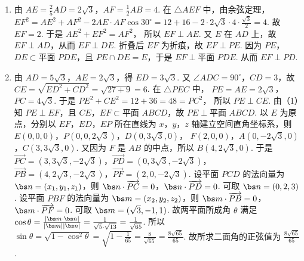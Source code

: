 \begin{solution}
\begin{enumerate}
\item 由
\(AE=\frac25 AD=2\sqrt3\)，\(AF=\frac12 AB=4\).
在 \(\triangle AEF\) 中，由余弦定理，
\(EF^2=AE^2+AF^2-2AE\cdot AF\cos 30^\circ =12+16-2\cdot 2\sqrt3\cdot 4\cdot \frac{\sqrt3}{2}=4\).
故
\(EF=2\).
于是
\(AE^2+EF^2=AF^2\)，
所以
\(EF\perp AE\).
又 \(E\) 在 \(AD\) 上，故 \(EF\perp AD\)，从而 \(EF\perp DE\).
折叠后 \(EF\) 为折痕，故 \(EF\perp PE\). 因为 \(PE\)，\(DE\subset \text{平面 }PDE\)，且 \(PE\cap DE=E\)，于是
\(EF\perp \text{平面 }PDE\).
从而
\(EF\perp PD\).

\item 由 \(AD=5\sqrt3\)，\(AE=2\sqrt3\)，得
\(ED=3\sqrt3\).
又 \(\angle ADC=90^\circ\)，\(CD=3\)，故
\(CE=\sqrt{ED^2+CD^2}=\sqrt{27+9}=6\).
在 \(\triangle PEC\) 中，
\(PE=AE=2\sqrt3\)，\(PC=4\sqrt3\).
于是
\(PE^2+CE^2=12+36=48=PC^2\)，
所以
\(PE\perp CE\).
由（1）知 \(PE\perp EF\)，且 \(CE\)，\(EF\subset \text{平面 }ABCD\)，故
\(PE\perp \text{平面 }ABCD\).
以 \(E\) 为原点，分别以 \(EF\)，\(ED\)，\(EP\) 所在直线为 \(x\)，\(y\)，\(z\) 轴建立空间直角坐标系，则
\(E(0,0,0)\)，\(P(0,0,2\sqrt3)\)，\(D(0,3\sqrt3,0)\)，
\(F(2,0,0)\)，\(A(0,-2\sqrt3,0)\)，\(C(3,3\sqrt3,0)\).
又因为 \(F\) 是 \(AB\) 的中点，所以
\(B(4,2\sqrt3,0)\).
于是
\(\overrightarrow{PC}=(3,3\sqrt3,-2\sqrt3)\)，\(\overrightarrow{PD}=(0,3\sqrt3,-2\sqrt3)\)，
\(\overrightarrow{PB}=(4,2\sqrt3,-2\sqrt3)\)，\(\overrightarrow{PF}=(2,0,-2\sqrt3)\).
设平面 \(PCD\) 的法向量为 \(\bs n=(x_1,y_1,z_1)\)，则
\(\bs n\cdot \overrightarrow{PC}=0\)，\(\bs n\cdot \overrightarrow{PD}=0\).
可取
\(\bs n=(0,2,3)\).
设平面 \(PBF\) 的法向量为 \(\bs m=(x_2,y_2,z_2)\)，则
\(\bs m\cdot \overrightarrow{PB}=0\)，\(\bs m\cdot \overrightarrow{PF}=0\).
可取
\(\bs m=(\sqrt3,-1,1)\).
故两平面所成角 \(\theta\) 满足
\(\cos\theta=\frac{|\bs m\cdot \bs n|}{|\bs m||\bs n|} =\frac{1}{\sqrt5\cdot \sqrt{13}} =\frac{1}{\sqrt{65}}\).
所以
\(\sin\theta=\sqrt{1-\cos^2\theta} =\sqrt{1-\frac{1}{65}} =\frac{8}{\sqrt{65}} =\frac{8\sqrt{65}}{65}\).
故所求二面角的正弦值为 \(\frac{8\sqrt{65}}{65}\).
\end{enumerate}
\end{solution}

